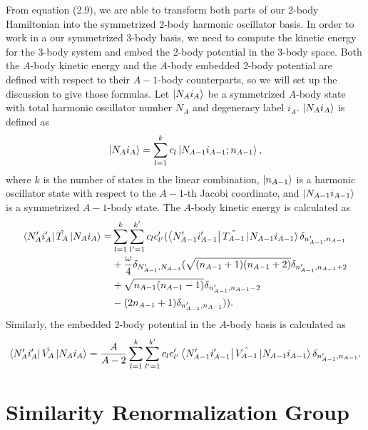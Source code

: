 From equation (2.9), we are able to transform both parts of our 2-body Hamiltonian into the symmetrized 2-body harmonic oscillator basis. In order to work in a our symmetrized 3-body basis, we need to compute the kinetic energy for the 3-body system and embed the 2-body potential in the 3-body space. Both the $A$-body kinetic energy and the $A$-body embedded 2-body potential are defined with respect to their $A-1$-body counterparts, so we will set up the discussion to give those formulas. Let $\ket{N_A i_A}$ be a symmetrized $A$-body state with total harmonic oscillator number $N_A$ and degeneracy label $i_A$. $\ket{N_A i_A}$ is defined as
\begin{equation}
\ket{N_A i_A} = \sum_{l=1}^k c_l \ket{N_{A-1} i_{A-1}; n_{A-1}},
\end{equation}
where $k$ is the number of states in the linear combination, $\ket{n_{A-1}}$ is a harmonic oscillator state with respect to the $A-1$-th Jacobi coordinate, and $\ket{N_{A-1} i_{A-1}}$ is a symmetrized $A-1$-body state. The $A$-body kinetic energy is calculated as
\begin{equation}
\begin{aligned}
\bra{N_A' i_A'}\hat{T_A}\ket{N_A i_A} = & \sum_{l=1}^k \sum_{l'=1}^{k'} c_l c_{l'}' (\bra{N_{A-1}' i_{A-1}'}\hat{T_{A-1}}\ket{N_{A-1} i_{A-1}}\delta_{n_{A-1}',n_{A-1}} \\ 
& + \frac{\omega}{4}\delta_{N_{A-1}',N_{A-1}}(\sqrt{(n_{A-1} + 1)(n_{A-1} + 2)}\delta_{n_{A-1}',n_{A-1} + 2} \\
& + \sqrt{n_{A-1}(n_{A-1} - 1)}\delta_{n_{A-1}',n_{A-1} - 2} \\
& - (2 n_{A-1} + 1)\delta_{n_{A-1}',n_{A-1}})).
\end{aligned}
\end{equation}
Similarly, the embedded 2-body potential in the $A$-body basis is calculated as
\begin{equation}
\bra{N_A' i_A'}\hat{V_A}\ket{N_A i_A} = \frac{A}{A-2} \sum_{l=1}^k \sum_{l'=1}^{k'} c_l c_{l'}' \bra{N_{A-1}' i_{A-1}'}\hat{V_{A-1}}\ket{N_{A-1} i_{A-1}}\delta_{n_{A-1}',n_{A-1}}.
\end{equation}

\section{Similarity Renormalization Group}

